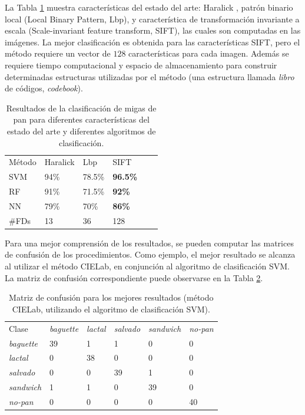 La Tabla \ref{tab:other} muestra características del estado del arte: Haralick \cite{Haralick73}, patrón binario local \cite{Ojala96} (Local Binary Pattern, \acrshort{Lbp}), y característica de transformación invariante a escala \cite{Lowe2004} (Scale-invariant feature transform, \acrshort{SIFT}), las cuales son computadas en las imágenes.
La mejor clasificación es obtenida para las características SIFT, pero el método requiere un vector de $128$ características para cada imagen.
Además se requiere tiempo computacional y espacio de almacenamiento para construir determinadas estructuras utilizadas por el método (una estructura llamada {\em libro} de códigos, {\em codebook}).


\begin{table}[h!]
\center
\begin{tabular}{llllll}
\hline\noalign{\smallskip}
Método & Haralick & Lbp & SIFT\\ %
\noalign{\smallskip}\hline\noalign{\smallskip}
SVM & 94\% & 78.5\% & \textbf{96.5\%} \\ %
RF  & 91\% & 71.5\% & \textbf{92\%} \\ %
NN & 79\% & 70\% & \textbf{86\%} \\ %
\noalign{\smallskip}\hline
\#FDs & 13 & 36 & 128 \\
\hline
\end{tabular}
\caption{Resultados de la clasificación de migas de pan para diferentes características del estado del arte y diferentes algoritmos de clasificación.}
\label{tab:other}       %
\end{table}


Para una mejor comprensión de los resultados, se pueden computar las matrices de confusión de los procedimientos.
Como ejemplo, el mejor resultado se alcanza al utilizar el método CIELab, en conjunción al algoritmo de clasificación SVM.
La matriz de confusión correspondiente puede observarse en la Tabla \ref{tab:confusionmatrix}.


\begin{table}[h!]
\center
\begin{tabular}{llllll}
\hline\noalign{\smallskip}
Clase&{\em baguette} & {\em lactal} & {\em salvado} &{\em sandwich}&{\em no-pan} \\
\noalign{\smallskip}\hline\noalign{\smallskip}
{\em baguette} & 39& 1 &1 &0 &0 \\
{\em lactal} & 0& 38 &0 &0 &0  \\
{\em salvado} & 0& 0 &39 &1 &0  \\
{\em sandwich} & 1& 1 &0 &39 &0  \\
{\em no-pan} & 0& 0 &0 &0 &40  \\
\hline
\end{tabular}
\caption{Matriz de confusión para los mejores resultados (método CIELab, utilizando el algoritmo de clasificación SVM).}
\label{tab:confusionmatrix}       %
\end{table}

